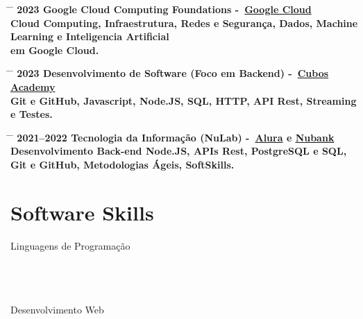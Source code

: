 \documentclass{article}
\begin{document}
\begin{tabbing}
	\hspace{2cm} \= \hspace{4cm} \= \kill
	\bf{2023} \> Google Cloud Computing Foundations -~\href{https://www.cloudskillsboost.google/public_profiles/3a03b48f-00f0-42a3-9800-4c045d78b21e/badges/3540421}{Google Cloud} \\
	Cloud Computing, Infraestrutura, Redes e Segurança, Dados, Machine Learning e Inteligencia Artificial\\ em Google Cloud. \\
\end{tabbing}

\begin{tabbing}
	\hspace{2cm} \= \hspace{4cm} \= \kill
	\bf{2023} \> Desenvolvimento de Software (Foco em Backend) -~\href{https://cubos.academy/}{Cubos Academy} \\
	Git e GitHub, Javascript, Node.JS, SQL, HTTP, API Rest, Streaming e Testes. \\
\end{tabbing}

\begin{tabbing}
	\hspace{2cm} \= \hspace{4cm} \= \kill
	\bf{2021--2022} \> Tecnologia da Informação (NuLab) -~\href{https://www.alura.com.br/}{Alura} e \href{https://nubank.com.br/}{Nubank}\\
	Desenvolvimento Back-end Node.JS, APIs Rest, PostgreSQL e SQL, Git e GitHub, Metodologias Ágeis, SoftSkills. \\
\end{tabbing}

\section*{Software Skills}

\begin{skillgroup}{Linguagens de Programação}%
	\\
	\\
	\\
	\\
\end{skillgroup}

\begin{skillgroup}{Desenvolvimento Web}%
	\\
\end{skillgroup}
\end{document}

